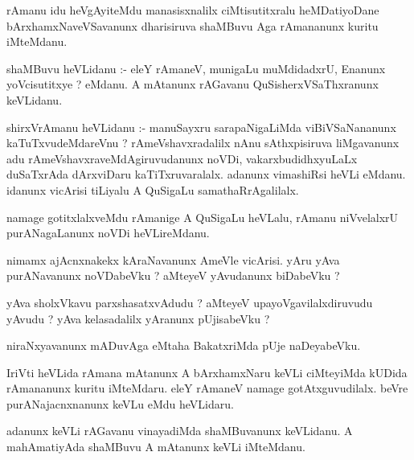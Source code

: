 \documentclass{article}
\begin{document}
\begin{mn}
rAmanu  idu  heVgAyiteMdu  manasisxnalilx  ciMtisutitxralu  heMDatiyoDane  bArxhamxNaveVSavanunx  dharisiruva  shaMBuvu  Aga  rAmananunx  kuritu  iMteMdanu.
\end{mn}

\begin{mn}
shaMBuvu  heVLidanu :- eleY  rAmaneV,  munigaLu  muMdidadxrU,  Enanunx  yoVcisutitxye ?  eMdanu.  A  mAtanunx  rAGavanu  QuSisherxVSaThxranunx  keVLidanu.
\end{mn}

\begin{mn}
shirxVrAmanu  heVLidanu :- manuSayxru  sarapaNigaLiMda  viBiVSaNananunx  kaTuTxvudeMdareVnu ?  rAmeVshavxradalilx  nAnu  sAthxpisiruva  liMgavanunx  adu  
rAmeVshavxraveMdAgiruvudanunx  noVDi,  vakarxbudidhxyuLaLx  duSaTxrAda  dArxviDaru  kaTiTxruvaralalx.  adanunx  vimashiRsi  heVLi  eMdanu.  idanunx  
vicArisi  tiLiyalu  A  QuSigaLu  samathaRrAgalilalx.
\end{mn}

\begin{mn}
namage  gotitxlalxveMdu  rAmanige  A  QuSigaLu  heVLalu,  rAmanu  niVvelalxrU  purANagaLanunx  noVDi  heVLireMdanu.
\end{mn}

\begin{mn}
nimamx  ajAcnxnakekx  kAraNavanunx  AmeVle  vicArisi.  yAru  yAva  purANavanunx  noVDabeVku ?  aMteyeV  yAvudanunx  biDabeVku ?
\end{mn}

\begin{mn}
yAva  sholxVkavu  parxshasatxvAdudu ?  aMteyeV  upayoVgavilalxdiruvudu  yAvudu ?  yAva  kelasadalilx  yAranunx  pUjisabeVku ?
\end{mn}

\begin{mn}
niraNxyavanunx  mADuvAga  eMtaha  BakatxriMda  pUje  naDeyabeVku. 
\end{mn}

\begin{mn}
IriVti  heVLida  rAmana  mAtanunx  A  bArxhamxNaru  keVLi  ciMteyiMda  kUDida  rAmananunx  kuritu  iMteMdaru.  eleY  rAmaneV  
namage  gotAtxguvudilalx.  beVre  purANajacnxnanunx  keVLu  eMdu  heVLidaru.
\end{mn}

\begin{mn}
adanunx  keVLi  rAGavanu  vinayadiMda  shaMBuvanunx  keVLidanu.  A  mahAmatiyAda  shaMBuvu  A  mAtanunx  keVLi  iMteMdanu.
\end{mn}
\end{document}
